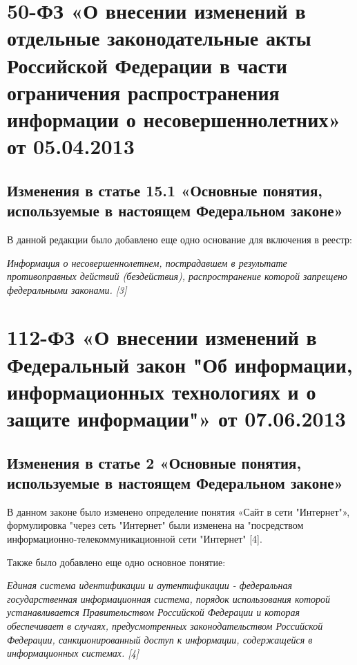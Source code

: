 \documentclass[14pt,a4paper,report]{article}
\begin{document}
\section{50-ФЗ «О внесении изменений в отдельные законодательные акты Российской Федерации в части ограничения распространения информации о несовершеннолетних» от 05.04.2013}

\subsection{Изменения в статье 15.1 «Основные понятия, используемые в настоящем Федеральном законе»}

В данной редакции было добавлено еще одно основание для включения в реестр:

\begin{displayquote}
\emph{Информация о несовершеннолетнем, пострадавшем в результате противоправных действий (бездействия), распространение которой запрещено федеральными законами. [3]}
\end{displayquote}

\section{112-ФЗ «О внесении изменений в Федеральный закон "Об информации, информационных технологиях и о защите информации"» от 07.06.2013}

\subsection{Изменения в статье 2 «Основные понятия, используемые в настоящем Федеральном законе»}

В данном законе было изменено определение понятия «Сайт в сети "Интернет"», формулировка "через сеть "Интернет" были изменена на "посредством информационно-телекоммуникационной сети "Интернет" [4].

Также было добавлено еще одно основное понятие:

\begin{displayquote}
	\emph{Единая система идентификации и аутентификации - федеральная государственная информационная система, порядок использования которой устанавливается Правительством Российской Федерации и которая обеспечивает в случаях, предусмотренных законодательством Российской Федерации, санкционированный доступ к информации, содержащейся в информационных системах. [4]}
\end{displayquote}
\end{document}
